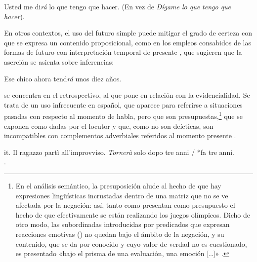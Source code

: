 \begin{exe}
  \ex\label{ex:14-dira} Usted me di\textit{rá} lo que tengo que hacer. (En vez
      de \textit{Dígame lo que tengo que hacer}).
\end{exe}

En otros contextos, el uso del futuro simple puede mitigar el grado de certeza
con que se expresa un contenido proposicional, como en los empleos consabidos de
las formas de futuro con interpretación temporal de presente
, que sugieren que la aserción se asienta sobre inferencias:

\begin{exe}
  \ex\label{ex:14-chico} Ese chico ahora tend\textit{rá} unos diez años.
\end{exe}

\textcite[30]{hassler2017} se concentra en el 
retrospectivo, al que pone en relación con la evidencialidad. Se trata de un uso
infrecuente en español, que aparece para referirse a situaciones pasadas con
respecto al momento de habla, pero que son presupuestas,\footnote{En el análisis
semántico, la presuposición alude al hecho de que hay expresiones lingüísticas
incrustadas dentro de una matriz que no se ve afectada por la negación: así,
tanto  como  presentan como presupuesto el
hecho de que efectivamente se están realizando los juegos olímpicos. Dicho de
otro modo, las subordinadas introducidas por predicados que expresan reacciones
emotivas () no quedan bajo el ámbito
de la negación, y su contenido, que se da por conocido y cuyo valor de verdad no
es cuestionado, es presentado «bajo el prisma de una evaluación, una emoción
[\ldots]» \parencite[§\,25.3z]{rae2025}.} que se exponen como dadas por el
locutor y que, como no son deícticas, son incompatibles con complementos
adverbiales referidos al momento presente .

\begin{exe}
  \ex\label{ex:14-ragazzo} it. Il ragazzo partì all'improvviso. \textit{Tornerà}
      solo dopo tre anni / *fa tre anni.\\
      .
\end{exe}

